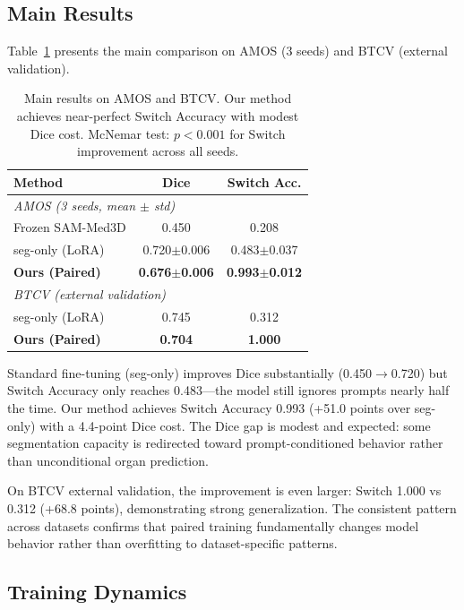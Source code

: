 \subsection{Main Results}

Table~\ref{tab:main} presents the main comparison on AMOS (3 seeds) and BTCV (external validation).

\begin{table}[t]
\centering
\small
\caption{Main results on AMOS and BTCV. Our method achieves near-perfect Switch Accuracy with modest Dice cost. McNemar test: $p < 0.001$ for Switch improvement across all seeds.}
\label{tab:main}
\begin{tabular}{lcc}
\toprule
\textbf{Method} & \textbf{Dice} & \textbf{Switch Acc.} \\
\midrule
\multicolumn{3}{l}{\textit{AMOS (3 seeds, mean $\pm$ std)}} \\
Frozen SAM-Med3D & 0.450 & 0.208 \\
seg-only (LoRA) & 0.720$\pm$0.006 & 0.483$\pm$0.037 \\
\textbf{Ours (Paired)} & \textbf{0.676$\pm$0.006} & \textbf{0.993$\pm$0.012} \\
\midrule
\multicolumn{3}{l}{\textit{BTCV (external validation)}} \\
seg-only (LoRA) & 0.745 & 0.312 \\
\textbf{Ours (Paired)} & \textbf{0.704} & \textbf{1.000} \\
\bottomrule
\end{tabular}
\end{table}

Standard fine-tuning (seg-only) improves Dice substantially (0.450$\to$0.720) but Switch Accuracy only reaches 0.483---the model still ignores prompts nearly half the time. Our method achieves Switch Accuracy 0.993 (+51.0 points over seg-only) with a 4.4-point Dice cost. The Dice gap is modest and expected: some segmentation capacity is redirected toward prompt-conditioned behavior rather than unconditional organ prediction.

On BTCV external validation, the improvement is even larger: Switch 1.000 vs 0.312 (+68.8 points), demonstrating strong generalization. The consistent pattern across datasets confirms that paired training fundamentally changes model behavior rather than overfitting to dataset-specific patterns.

\subsection{Training Dynamics}


